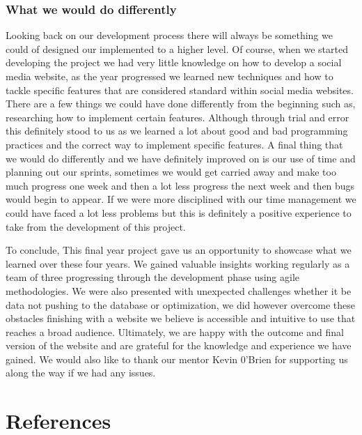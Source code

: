 \subsection{What we would do differently}
\newline
Looking back on our development process there will always be something we could of designed our implemented to a higher level. Of course, when we started developing the project we had very little knowledge on how to develop a social media website, as the year progressed we learned new techniques and how to tackle specific features that are considered standard within social media websites. There are a few things we could have done differently from the beginning such as, researching how to implement certain features. Although through trial and error this definitely stood to us as we learned a lot about good and bad programming practices and the correct way to implement specific features. A final thing that we would do differently and we have definitely improved on is our use of time and planning out our sprints, sometimes we would get carried away and make too much progress one week and then a lot less progress the next week and then bugs would begin to appear. If we were more disciplined with our time management we could have faced a lot less problems but this is definitely a positive experience to take from the development of this project.
\newline

To conclude, This final year project gave us an opportunity to showcase what we learned over these four years. We gained valuable insights working regularly as a team of three progressing through the development phase using agile methodologies.
We were also presented with unexpected challenges whether it be data not pushing to the database or optimization, we did however overcome these obstacles finishing with a website we believe is accessible and intuitive to use that reaches a broad audience.
\newline
Ultimately, we are happy with the outcome and final version of the website and are grateful for the knowledge and experience we have gained. We would also like to thank our mentor Kevin 0'Brien for supporting us along the way if we had any issues.

\chapter{References}
\cite{githublink}